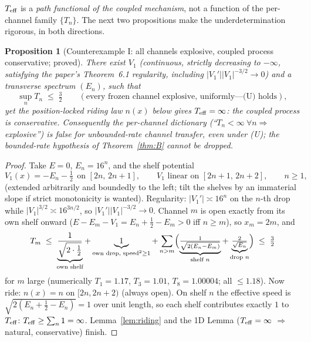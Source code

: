 \documentclass[11pt]{article}
\newtheorem{proposition}[theorem]{Proposition}
\theoremstyle{remark}
\begin{document}
$T_{\rm eff}$ is a \emph{path functional of the coupled mechanism}, not
a function of the per-channel family $\{T_{n}\}$.  The next two
propositions make the underdetermination rigorous, in both directions.

\begin{proposition}[Counterexample I: all channels explosive, coupled
process conservative; proved]\label{prop:ce1}
There exist $V_{1}$ (continuous, strictly decreasing to $-\infty$,
satisfying the paper's Theorem~6.1 regularity, including
$|V_{1}'||V_{1}|^{-3/2}\to0$) and a transverse spectrum
$(E_{n})$, such that
\[
\sup_{n}T_{n}\;\le\;\tfrac32
\qquad(\text{every frozen channel explosive, uniformly---(U) holds}),
\]
yet the position-locked riding law $n(x)$ below gives
$T_{\rm eff}=\infty$: the coupled process is \emph{conservative}.
Consequently the per-channel dictionary
(``$T_{n}<\infty\ \forall n\Rightarrow$ explosive'') is \emph{false}
for unbounded-rate channel transfer, even under (U); the bounded-rate
hypothesis of Theorem~\ref{thm:B} cannot be dropped.
\end{proposition}

\begin{proof}
Take $E=0$, $E_{n}=16^{n}$, and the shelf potential
\[
V_{1}(x)=-E_{n}-\tfrac12 \ \ \text{on } [2n,\,2n+1],\qquad
V_{1} \text{ linear on } [2n+1,\,2n+2],\qquad n\ge1,
\]
(extended arbitrarily and boundedly to the left; tilt the shelves by an
immaterial slope if strict monotonicity is wanted).  Regularity:
$|V_{1}'|\asymp16^{n}$ on the $n$-th drop while
$|V_{1}|^{3/2}\asymp16^{3n/2}$, so
$|V_{1}'||V_{1}|^{-3/2}\to0$.  Channel $m$ is open exactly from its own
shelf onward ($E-E_{m}-V_{1}=E_{n}+\tfrac12-E_{m}>0$ iff $n\ge m$),
so $x_{m}=2m$, and
\[
T_{m}\;\le\;
\underbrace{\frac{1}{\sqrt{2\cdot\tfrac12}}}_{\text{own shelf}}
+\underbrace{1}_{\text{own drop, speed}^{2}\ge1}
+\sum_{n>m}\Bigl(\underbrace{\tfrac{1}{\sqrt{2(E_{n}-E_{m})}}}_{\text{shelf }n}
+\underbrace{\tfrac{2}{\sqrt{E_{n}}}}_{\text{drop }n}\Bigr)
\;\le\;\tfrac32
\]
for $m$ large (numerically $T_{1}=1.17$, $T_{3}=1.01$,
$T_{8}=1.00004$; all $\le1.18$).  Now ride: $n(x)=n$ on
$[2n,2n+2)$ (always open).  On shelf $n$ the effective speed is
$\sqrt{2(E_{n}+\tfrac12-E_{n})}=1$ over unit length, so each shelf
contributes exactly $1$ to $T_{\rm eff}$:
$T_{\rm eff}\ge\sum_{n}1=\infty$.  Lemma~\ref{lem:riding} and the 1D
Lemma ($T_{\rm eff}=\infty$ $\Rightarrow$ natural, conservative)
finish.
\end{proof}
\end{document}
